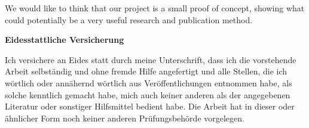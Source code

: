 \documentclass[12pt,a4paper]{article}
\begin{document}
We would like to think that our project is a small proof of concept, showing what could potentially be a very useful research and publication method.

\newpage
\renewcommand*{\mkbibnamefamily}[1]{\textbf{#1}}
\renewcommand*{\mkbibnamegiven}[1]{\textbf{#1}}
\renewcommand*{\mkbibnameprefix}[1]{\textbf{#1}}
\renewcommand*{\mkbibnamesuffix}[1]{\textbf{#1}}
\printbibliography[title=paper/references]

\newpage
\textbf{Eidesstattliche Versicherung}

\bigskip

Ich versichere an Eides statt durch meine Unterschrift, dass ich die vorstehende Arbeit selbständig und ohne fremde Hilfe angefertigt und alle Stellen, die ich wörtlich oder annähernd wörtlich aus Veröffentlichungen entnommen habe, als solche kenntlich gemacht habe, mich auch keiner anderen als der angegebenen Literatur oder sonstiger Hilfsmittel bedient habe. Die Arbeit hat in dieser oder ähnlicher Form noch keiner anderen Prüfungsbehörde vorgelegen.

\vspace{1cm}
\rule{0pt}{2\baselineskip} %
\par\noindent{} \hfill\makebox[2.25in]{\hrulefill}%
\par\noindent\makebox[2.25in][l]{} \hfill{}%
\end{document}
